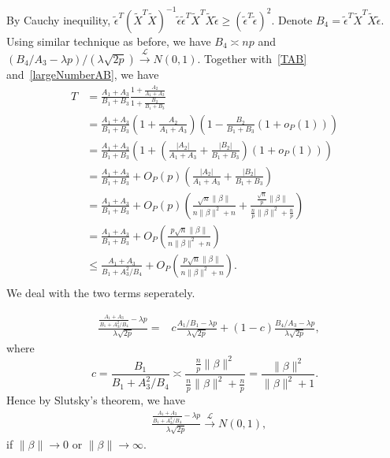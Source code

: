 \documentclass[review]{elsarticle}
\theoremstyle{plain}
\theoremstyle{definition}
\theoremstyle{remark}
\begin{document}
By Cauchy inequility,
    $\tilde{\epsilon}^T {(\tilde{X}^T\tilde{X})}^{-1} \tilde{\epsilon}
    \tilde{\epsilon}^T \tilde{X}^T\tilde{X} \tilde{\epsilon}\geq {(\tilde{\epsilon}^T \tilde{\epsilon})}^2$.
    Denote $B_4=\tilde{\epsilon}^T \tilde{X}^T\tilde{X} \tilde{\epsilon}$. Using similar technique as before, we have $B_4\asymp np $ and $(B_4/A_3-\lambda p)/(\lambda \sqrt{2p})\xrightarrow{\mathcal{L}}N(0,1)$.
    Together with~\eqref{TAB} and~\eqref{largeNumberAB}, we have
    \begin{equation}\label{ChangT}
        \begin{aligned}
            T&=\frac{A_1+A_3}{B_1+B_3}\frac{1+\frac{A_2}{A_1+A_3}}{1+\frac{B_2}{B_1+B_3}}\\
            &=\frac{A_1+A_3}{B_1+B_3}{(1+\frac{A_2}{A_1+A_3})}{(1-\frac{B_2}{B_1+B_3}(1+o_P(1)))}\\
            &=\frac{A_1+A_3}{B_1+B_3}{(1+(\frac{|A_2|}{A_1+A_3}+\frac{|B_2|}{B_1+B_3})(1+o_P(1)))}\\
            &=\frac{A_1+A_3}{B_1+B_3}+O_P(p)(\frac{|A_2|}{A_1+A_3}+\frac{|B_2|}{B_1+B_3})\\
            &=\frac{A_1+A_3}{B_1+B_3}+O_P(p)(\frac{\sqrt{n}\|\beta\|}{n\|\beta\|^2+n}+\frac{\frac{\sqrt{n}}{p}\|\beta\|}{\frac{n}{p}\|\beta\|^2+\frac{n}{p}})\\
            &=\frac{A_1+A_3}{B_1+B_3}+O_P(\frac{p\sqrt{n}\|\beta\|}{n\|\beta\|^2+n})\\
            &\leq\frac{A_1+A_3}{B_1+A_3^2/B_4}+O_P(\frac{p\sqrt{n}\|\beta\|}{n\|\beta\|^2+n}).\\
        \end{aligned}
    \end{equation}
We deal with the two terms seperately.


\begin{equation}
    \begin{aligned}
        &\frac{\frac{A_1+A_3}{B_1+A_3^2/B_4}-{\lambda p}}{\lambda\sqrt{2p}}=&c\frac{{A_1}/{B_1}-\lambda p}{\lambda \sqrt{2p}}
        +(1-c)\frac{{B_4}/{A_3}-\lambda p}{\lambda \sqrt{2p}},
    \end{aligned}
\end{equation}
where 
\begin{equation}
    c=\frac{B_1}{B_1+A_3^2/B_4}\asymp \frac{\frac{n}{p}\|\beta\|^2}{\frac{n}{p}\|\beta\|^2+\frac{n}{p}}
    =\frac{\|\beta\|^2}{\|\beta\|^2+1}.
\end{equation}
Hence by Slutsky's theorem, we have
\begin{equation}
    \begin{aligned}
        &\frac{\frac{A_1+A_3}{B_1+A_3^2/B_4}-{\lambda p}}{\lambda\sqrt{2p}}\xrightarrow{\mathcal{L}} N(0,1),
    \end{aligned}
\end{equation}
if $\|\beta\|\to 0$ or $\|\beta\|\to \infty$.
\end{document}
